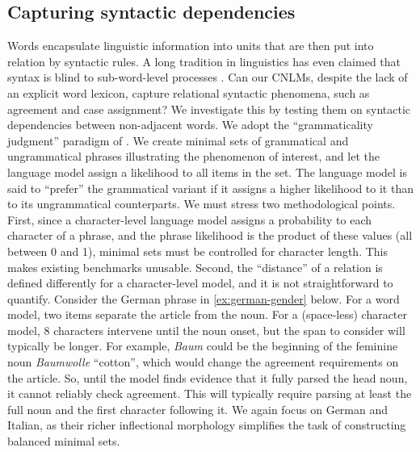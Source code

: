 \subsection{Capturing syntactic dependencies}
\label{sec:dependencies}

Words encapsulate linguistic information into units that are then put
into relation by syntactic rules. A long tradition in linguistics has
even claimed that syntax is blind to sub-word-level processes
\cite[e.g.,][]{Chomsky:1970,DiSciullo:Williams:1987,Bresnan:Mchombo:1995,Williams:2007}. Can
our CNLMs, despite the lack of an explicit word lexicon, capture
relational syntactic phenomena, such as agreement and case assignment?
We investigate this by testing them on syntactic dependencies between
non-adjacent words. We adopt the ``grammaticality judgment'' paradigm
of . We create minimal sets of grammatical
and ungrammatical phrases illustrating the phenomenon of interest, and
let the language model assign a likelihood to all items in the
set. The language model is said to ``prefer'' the grammatical variant
if it assigns a higher likelihood to it than to its ungrammatical
counterparts. We must stress two methodological points. First, since a
character-level language model assigns a probability to each character
of a phrase, and the phrase likelihood is the product of these values
(all between 0 and 1), minimal sets must be controlled for character
length. This makes existing benchmarks unusable. Second, the
``distance'' of a relation is defined differently for a
character-level model, and it is not straightforward to
quantify. Consider the German phrase in \ref{ex:german-gender}
below. For a word model, two items separate the article from the
noun. For a (space-less) character model, 8 characters intervene until
the noun onset, but the span to consider will typically be longer. For
example, \emph{Baum} could be the beginning of the feminine noun
\emph{Baumwolle} ``cotton'', which would change the agreement
requirements on the article. So, until the model finds evidence that
it fully parsed the head noun, it cannot reliably check
agreement. This will typically require parsing at least the full noun
and the first character following it. We again focus on German and Italian, as their richer inflectional
morphology simplifies the task of constructing balanced minimal sets.




